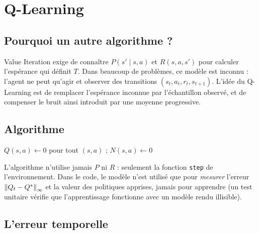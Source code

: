 \section{Q-Learning}\label{sec-qlearning}

\subsection{Pourquoi un autre algorithme ?}

Value Iteration exige de connaître $P(s'\mid s,a)$ et $R(s,a,s')$ pour calculer l'espérance qui définit $T$. Dans beaucoup de problèmes, ce modèle est inconnu : l'agent ne peut qu'agir et observer des transitions $(s_t,a_t,r_t,s_{t+1})$. L'idée du Q-Learning est de remplacer l'espérance inconnue par l'échantillon observé, et de compenser le bruit ainsi introduit par une moyenne progressive.

\subsection{Algorithme}

\begin{algorithm}[ht]
\caption{Q-Learning tabulaire (fonction \texttt{q\_learning})}
$Q(s,a)\leftarrow0$ pour tout $(s,a)$ ; $N(s,a)\leftarrow0$\;
\end{algorithm}

L'algorithme n'utilise jamais $P$ ni $R$ : seulement la fonction \texttt{step} de l'environnement. Dans le code, le modèle n'est utilisé que pour \emph{mesurer} l'erreur $\left\lVert Q_t-Q^* \right\rVert_\infty$ et la valeur des politiques apprises, jamais pour apprendre (un test unitaire vérifie que l'apprentissage fonctionne avec un modèle rendu illisible).

\subsection{L'erreur temporelle}

